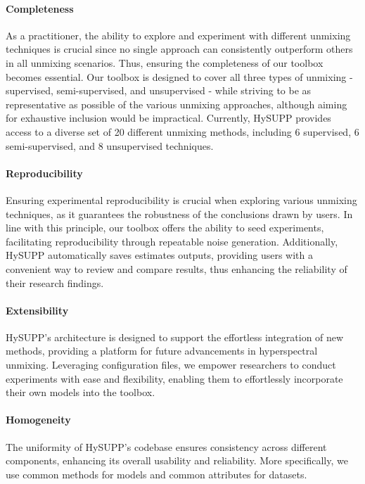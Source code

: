 \paragraph{Completeness}

As a practitioner, the ability to explore and experiment with different unmixing techniques is crucial since no single approach can consistently outperform others in all unmixing scenarios. 
Thus, ensuring the completeness of our toolbox becomes essential. 
Our toolbox is designed to cover all three types of unmixing - supervised, semi-supervised, and unsupervised - while striving to be as representative as possible of the various unmixing approaches, although aiming for exhaustive inclusion would be impractical. 
Currently, HySUPP provides access to a diverse set of 20 different unmixing methods, including 6 supervised, 6 semi-supervised, and 8 unsupervised techniques.

\paragraph{Reproducibility}

Ensuring experimental reproducibility is crucial when exploring various unmixing techniques, as it guarantees the robustness of the conclusions drawn by users. 
In line with this principle, our toolbox offers the ability to seed experiments, facilitating reproducibility through repeatable noise generation.
Additionally, HySUPP automatically saves estimates outputs, providing users with a convenient way to review and compare results, thus enhancing the reliability of their research findings.

\paragraph{Extensibility}

HySUPP's architecture is designed to support the effortless integration of new methods, providing a platform for future advancements in hyperspectral unmixing. 
Leveraging configuration files, we empower researchers to conduct experiments with ease and flexibility, enabling them to effortlessly incorporate their own models into the toolbox.

\paragraph{Homogeneity}

The uniformity of HySUPP's codebase ensures consistency across different components, enhancing its overall usability and reliability. 
More specifically, we use common methods for models and common attributes for datasets.


